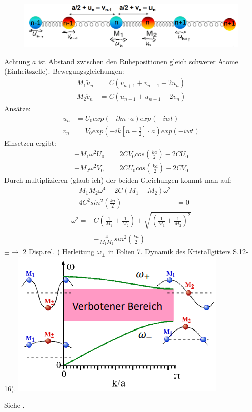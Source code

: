 \begin{minipage}[t]{0.5\textwidth}
    \centering
    \begin{figure}[H]
        \includegraphics[width=0.9\linewidth]{resources/16-03-2012/q49_diff_mass.png}
    \end{figure}
    Achtung $a$ ist Abstand zwischen den Ruhepositionen gleich schwerer Atome (Einheitszelle).
    Bewegungsgleichungen:
    \begin{align*}
        M_1 \ddot{u}_n &= C\left(v_{n+1} + v_{n-1} - 2u_n\right)\\
        M_2 \ddot{v}_n &= C\left(u_{n+1} + u_{n-1} - 2v_n\right)
    \end{align*}
    Ansätze:
    \begin{align*}
        u_n &= U_0 exp\left(-ikn\cdot a\right)exp(-iwt)\\
        v_n &= V_0 exp\left(-ik\left[n-\frac{1}{2}\right]\cdot a\right)exp(-iwt)
    \end{align*}
    Einsetzen ergibt:
    \begin{align*}
        - M_1 \omega^2 U_0 &= 2CV_0 cos \left(\frac{ka}{2}\right) - 2CU_0\\
        - M_2 \omega^2 V_0 &= 2CU_0 cos \left(\frac{ka}{2}\right) - 2CV_0
    \end{align*}
    Durch multiplizieren (glaub ich) der beiden Gleichungen kommt man auf:
    \begin{align*}
        - M_1M_2\omega^4 - 2C \left(M_1 + M_2\right) \omega^2&\\
        + 4C^2 sin^2\left(\frac{ka}{2}\right)& = 0
    \end{align*}
    \begin{align*}
        \omega^2 = &C \left(\frac{1}{M_1} + \frac{1}{M_2}\right) \pm \sqrt{\left(\frac{1}{M_1} + \frac{1}{M_2}\right)^2} \\
        &\overline{- \frac{4}{M_1 M_2}sin^2\left(\frac{ka}{2}\right)}
    \end{align*}
    $\pm \rightarrow$ 2 Disp.rel. ( Herleitung $\omega_{\pm}$ in Folien 7. Dynamik des Kristallgitters S.12-16).
    \includegraphics[width=0.7\linewidth]{resources/16-03-2012/q49_diff_mass_disp.png}
\end{minipage}

\label{q:50}

Siehe .

\newpage